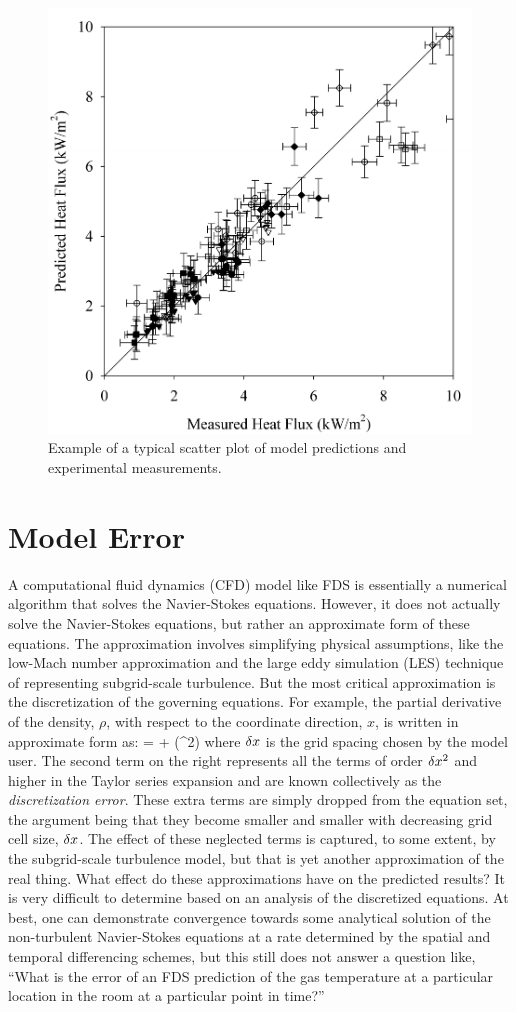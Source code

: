 \begin{figure}[ht]
\begin{center}
\includegraphics[height=3.in]{FIGURES/scatterplot}
\end{center}
\caption[Sample scatter plot.]{Example of a typical scatter plot of model predictions and experimental measurements.}
\label{scatterplot}
\end{figure}


\section{Model Error}

A computational fluid dynamics (CFD) model like FDS is essentially a numerical algorithm that solves the Navier-Stokes equations.
However, it does not actually solve the Navier-Stokes equations, but rather an approximate form of these equations. The approximation involves simplifying
physical assumptions, like the low-Mach number approximation and the large eddy simulation (LES) technique of representing subgrid-scale turbulence.
But the most critical approximation is the discretization of the governing equations. For example, the partial derivative of the density, $\rho$,
with respect to the coordinate direction, $x$, is written in approximate form as:
\be {} =  + (\dx^2) \ee
where $\delta x$ is the grid spacing chosen by the model user.
The second term on the right represents all the terms of order $\delta x^2$ and higher in the Taylor series expansion and are known collectively as the
{\em discretization error}. These extra terms are simply dropped from
the equation set, the argument being that they become smaller and smaller with decreasing grid cell size, $\delta x$. The effect of these neglected terms is captured, to
some extent, by the subgrid-scale turbulence model, but that is yet another approximation of the real thing. What effect do these approximations have on
the predicted results? It is very difficult to determine based on an analysis of the discretized equations. At best, one can demonstrate convergence towards some
analytical solution of the non-turbulent Navier-Stokes equations at a rate determined by the spatial and temporal differencing schemes, but this still does not answer a
question like, ``What is the error of an FDS prediction of the gas temperature at a particular location in the room at a particular point in time?''

